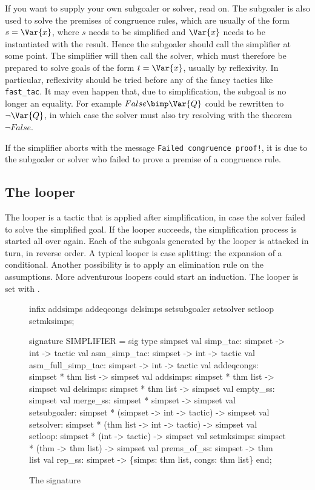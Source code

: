 \begin{warn}
  If you want to supply your own subgoaler or solver, read on.  The subgoaler
  is also used to solve the premises of congruence rules, which are usually
  of the form $s = \Var{x}$, where $s$ needs to be simplified and $\Var{x}$
  needs to be instantiated with the result. Hence the subgoaler should call
  the simplifier at some point. The simplifier will then call the solver,
  which must therefore be prepared to solve goals of the form $t = \Var{x}$,
  usually by reflexivity. In particular, reflexivity should be tried before
  any of the fancy tactics like {\tt fast_tac}. It may even happen that, due
  to simplification, the subgoal is no longer an equality. For example $False
  \bimp \Var{Q}$ could be rewritten to $\neg\Var{Q}$, in which case the
  solver must also try resolving with the theorem $\neg False$.

  If the simplifier aborts with the message {\tt Failed congruence proof!},
  it is due to the subgoaler or solver who failed to prove a premise of a
  congruence rule.
\end{warn}

\subsection{The looper} 
The looper is a tactic that is applied after simplification, in case the
solver failed to solve the simplified goal.  If the looper succeeds, the
simplification process is started all over again.  Each of the subgoals
generated by the looper is attacked in turn, in reverse order.  A
typical looper is case splitting: the expansion of a conditional.  Another
possibility is to apply an elimination rule on the assumptions.  More
adventurous loopers could start an induction.  The looper is set with 
.


\begin{figure}
\begin{ttbox}
infix addsimps addeqcongs delsimps
      setsubgoaler setsolver setloop setmksimps;

signature SIMPLIFIER =
sig
  type simpset
  val simp_tac:          simpset -> int -> tactic
  val asm_simp_tac:      simpset -> int -> tactic
  val asm_full_simp_tac: simpset -> int -> tactic
  val addeqcongs:  simpset * thm list -> simpset
  val addsimps:    simpset * thm list -> simpset
  val delsimps:    simpset * thm list -> simpset
  val empty_ss:     simpset
  val merge_ss:     simpset * simpset -> simpset
  val setsubgoaler: simpset * (simpset -> int -> tactic) -> simpset
  val setsolver:    simpset * (thm list -> int -> tactic) -> simpset
  val setloop:      simpset * (int -> tactic) -> simpset
  val setmksimps:   simpset * (thm -> thm list) -> simpset
  val prems_of_ss:  simpset -> thm list
  val rep_ss:       simpset -> \{simps: thm list, congs: thm list\}
end;
\end{ttbox}
\caption{The signature } \label{SIMPLIFIER}
\end{figure}


